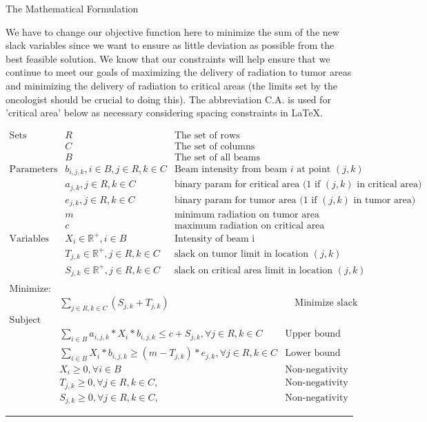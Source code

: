 \documentclass[12pt]{article}
\makeatletter
\newenvironment{task}{\@startsection
       {section}{1}
       {0.4em}{-.5ex plus -1ex minus -.2ex}{.5ex plus .2ex}
       {\pagebreak[3]\large\bf\noindent{Task}}}
       {\nopagebreak[3]\vspace{3ex}\begin{center}\rule{1\linewidth}{.3pt}\end{center}}
\makeatother
\begin{document}
\begin{task}{The Mathematical Formulation}
\begin{enumerate}
We have to change our objective function here to minimize the sum of the new slack variables since we want to ensure as little deviation as possible from the best feasible solution. We know that our constraints will help ensure that we continue to meet our goals of maximizing the delivery of radiation to tumor areas and minimizing the delivery of radiation to critical areas (the limits set by the oncologist should be crucial to doing this). The abbreviation C.A. is used for 'critical area' below as necessary considering spacing constraints in LaTeX. 

\begin{eqnarray*}  
 \textrm{Sets} &  R & \textrm{The set of rows} \\
			& C & \textrm{The set of columns}\\ 
			& B & \textrm{The set of all beams} \\
 \textrm{Parameters} & b_{i,j,k}, i \in B, j \in R, k \in C   & \textrm{Beam intensity from beam $i$ at point $(j,k)$} \\
& a_{j,k}, j \in R, k \in C   & \textrm{binary param for critical area (1 if $(j,k)$ in critical area)} \\ 
& e_{j,k}, j \in R, k \in C   & \textrm{binary param for tumor area (1 if $(j,k)$ in tumor area)} \\ 
& m & \textrm{minimum radiation on tumor area} \\
& c & \textrm{maximum radiation on critical area} \\
\textrm{Variables} 
& X_{i} \in \mathbb{R}^+, i \in B & \textrm{Intensity of beam i} \\
& T_{j,k} \in \mathbb{R}^+, j \in R, k \in C & \textrm{slack on tumor limit in location $(j,k)$} \\
& S_{j,k} \in \mathbb{R}^+, j \in R, k \in C & \textrm{slack on critical area limit in location $(j,k)$} \\
\end{eqnarray*}
\begin{eqnarray*} 
\textrm{Minimize:}\\ 
& \sum_{j \in R, k \in C} (S_{j,k} + T_{j,k}) & \quad \textrm{Minimize slack variable sum}\\ 
\textrm{Subject to:}\\
& \sum_{i \in B} a_{i,j,k} * X_{i} * b_{i,j,k} \leq c + S_{j,k}, \forall j \in R, k \in C & \textrm {Upper bound on C.A. radiation} \\
& \sum_{i \in B} X_{i} * b_{i,j,k} \geq (m - T_{j,k}) * e_{j,k}, \forall j \in R, k \in C & \textrm {Lower bound on tumor radiation} \\
& X_{i} \geq 0, \forall i \in B & \textrm{Non-negativity constraint} \\
& T_{j,k} \geq 0, \forall j \in R, k \in C, & \textrm{Non-negativity slack constraint}  \\
& S_{j,k} \geq 0, \forall j \in R, k \in C, & \textrm{Non-negativity slack constraint} 
\end{eqnarray*}


\end{enumerate}
\end{task}
\end{document}
